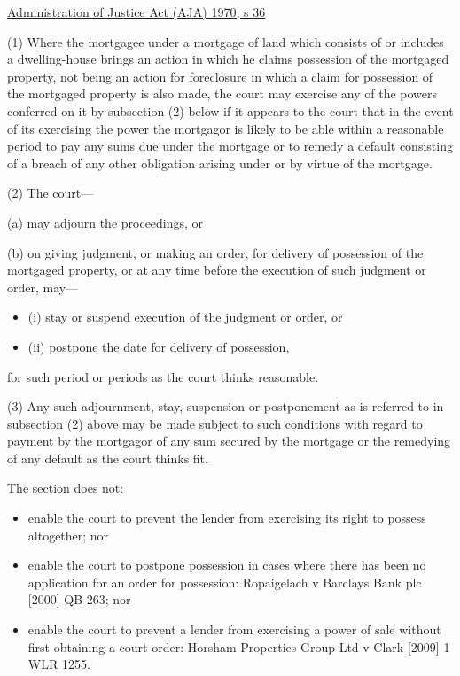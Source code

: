 \documentclass[
]{article}
\providecommand{\tightlist}{%
  \setlength{\itemsep}{0pt}\setlength{\parskip}{0pt}}
\newenvironment{env-9843ce55-0506-497d-95ba-03a690b05b3c}
{
    \savenotes\tcolorbox[blanker,breakable,left=5pt,borderline west={2pt}{-4pt}{green}]
}
{
    \endtcolorbox\spewnotes
}
\begin{document}
\begin{env-9843ce55-0506-497d-95ba-03a690b05b3c}

\href{https://www.legislation.gov.uk/ukpga/1970/31/section/36}{Administration
of Justice Act (AJA) 1970, s 36}

(1) Where the mortgagee under a mortgage of land which consists of or
includes a dwelling-house brings an action in which he claims possession
of the mortgaged property, not being an action for foreclosure in which
a claim for possession of the mortgaged property is also made, the court
may exercise any of the powers conferred on it by subsection (2) below
if it appears to the court that in the event of its exercising the power
the mortgagor is likely to be able within a reasonable period to pay any
sums due under the mortgage or to remedy a default consisting of a
breach of any other obligation arising under or by virtue of the
mortgage.

(2) The court---

(a) may adjourn the proceedings, or

(b) on giving judgment, or making an order, for delivery of possession
of the mortgaged property, or at any time before the execution of such
judgment or order, may---

\begin{itemize}
\tightlist
\item
  (i) stay or suspend execution of the judgment or order, or
\item
  (ii) postpone the date for delivery of possession,
\end{itemize}

for such period or periods as the court thinks reasonable.

(3) Any such adjournment, stay, suspension or postponement as is
referred to in subsection (2) above may be made subject to such
conditions with regard to payment by the mortgagor of any sum secured by
the mortgage or the remedying of any default as the court thinks fit.

\end{env-9843ce55-0506-497d-95ba-03a690b05b3c}

The section does not:

\begin{itemize}
\tightlist
\item
  enable the court to prevent the lender from exercising its right to
  possess altogether; nor
\item
  enable the court to postpone possession in cases where there has been
  no application for an order for possession: Ropaigelach v Barclays
  Bank plc {[}2000{]} QB 263; nor
\item
  enable the court to prevent a lender from exercising a power of sale
  without first obtaining a court order: Horsham Properties Group Ltd v
  Clark {[}2009{]} 1 WLR 1255.
\end{itemize}
\end{document}
